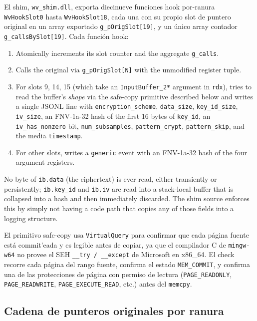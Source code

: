 \documentclass[11pt,letterpaper]{article}
\begin{document}
El shim, \texttt{wv\_shim.dll}, exporta diecinueve funciones hook
por-ranura \texttt{WvHookSlot0} hasta \texttt{WvHookSlot18}, cada
una con su propio slot de puntero original en un array exportado
\texttt{g\_pOrigSlot[19]}, y un único array contador
\texttt{g\_callsBySlot[19]}. Cada función hook:

\begin{enumerate}[itemsep=2pt,topsep=2pt]
  \item Atomically increments its slot counter and the aggregate
        \texttt{g\_calls}.
  \item Calls the original via \texttt{g\_pOrigSlot[N]} with the
        unmodified register tuple.
  \item For slots 9, 14, 15 (which take an \texttt{InputBuffer\_2*}
        argument in \texttt{rdx}), tries to read the buffer's
        \emph{shape} via the safe-copy primitive described below
        and writes a single JSONL line with
        \texttt{encryption\_scheme}, \texttt{data\_size},
        \texttt{key\_id\_size}, \texttt{iv\_size}, an FNV-1a-32 hash
        of the first 16 bytes of \texttt{key\_id}, an
        \texttt{iv\_has\_nonzero} bit, \texttt{num\_subsamples},
        \texttt{pattern\_crypt}, \texttt{pattern\_skip}, and the
        media \texttt{timestamp}.
  \item For other slots, writes a \texttt{generic} event with an
        FNV-1a-32 hash of the four argument registers.
\end{enumerate}

\noindent No byte of \texttt{ib.data} (the ciphertext) is ever read,
either transiently or persistently; \texttt{ib.key\_id} and
\texttt{ib.iv} are read into a stack-local buffer that is collapsed
into a hash and then immediately discarded. The shim source enforces
this by simply not having a code path that copies any of those
fields into a logging structure.

El primitivo safe-copy usa \texttt{VirtualQuery} para confirmar
que cada página fuente está commit'eada y es legible antes de
copiar, ya que el compilador C de \texttt{mingw-w64} no provee
el SEH \texttt{\_\_try / \_\_except} de Microsoft en x86\_64. El
check recorre cada página del rango fuente, confirma el estado
\texttt{MEM\_COMMIT}, y confirma una de las protecciones de
página con permiso de lectura (\texttt{PAGE\_READONLY},
\texttt{PAGE\_READWRITE}, \texttt{PAGE\_EXECUTE\_READ}, etc.)
antes del \texttt{memcpy}.

\subsection{Cadena de punteros originales por ranura}
\label{sec:runtime-orig}
\end{document}
